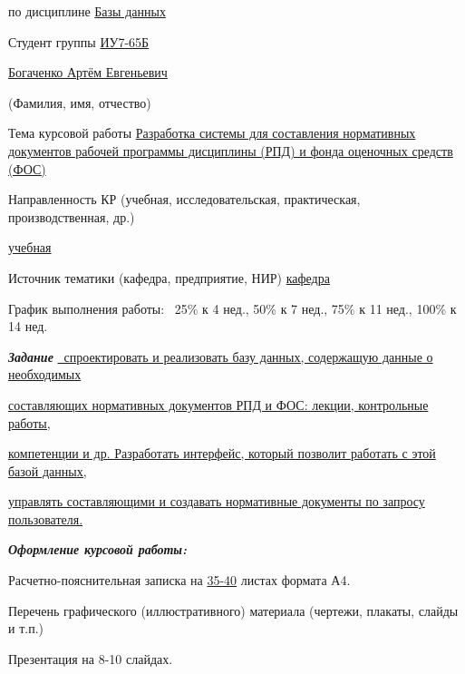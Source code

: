 \begin{flushleft}
	\fontsize{12pt}{0.6cm}\selectfont
	
	по дисциплине \uline{\hfill Базы данных\hfill}
	
	Студент группы \uline{ИУ7-65Б}
	
	\centerline{\uline{\hfill Богаченко Артём Евгеньевич \hfill}}
	\scriptsize\mbox{\hspace{7cm}}(Фамилия, имя, отчество)
	
	\fontsize{12pt}{0.6cm}\selectfont
	
	\fontsize{12pt}{0.5\baselineskip}\selectfont
	Тема курсовой работы {\uline{\hfill Разработка системы для составления нормативных документов рабочей программы дисциплины (РПД) и фонда оценочных средств (ФОС) \hfill}}

	
	Направленность КР (учебная, исследовательская, практическая, производственная, др.)\hfill\centerline{\uline{\hfill учебная \hfill}}
	
	Источник тематики (кафедра, предприятие, НИР) {\uline{\hfill кафедра \hfill}}
	
	\fontsize{12pt}{0.6\baselineskip}\selectfont
	График выполнения работы: ~25\% к 4 нед., 50\% к 7 нед., 75\% к 11 нед., 100\% к 14 нед.
	
	\addvspace{8pt}
	\fontsize{12pt}{0.5\baselineskip}\selectfont
	\textit{\bfseries{Задание}} 
	\uline{~спроектировать и реализовать базу данных, содержащую данные о необходимых\hfill} 
	
	\uline{составляющих нормативных документов РПД и ФОС: лекции, контрольные работы,\hfill} 
	
	\uline{компетенции и др. Разработать интерфейс, который позволит работать с этой базой данных,\hfill} 
	
	\uline{управлять составляющими и создавать нормативные документы по запросу пользователя.\hfill}
	
	\addvspace{6pt}
	
	\textit{\bfseries{Оформление курсовой работы:}}

	\fontsize{12pt}{0.1cm}\selectfont
	Расчетно-пояснительная записка на \uline{35-40} листах формата А4.
	
	Перечень графического (иллюстративного) материала (чертежи, плакаты, слайды и т.п.)
	
	Презентация на 8-10 слайдах.
\end{flushleft}

\vspace*{-0.3cm}

